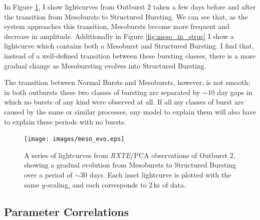 \par In Figure \ref{fig:meso_to_struc}, I show lightcurves from Outburst 2 taken a few days before and after the transition from Mesobursts to Structured Bursting.  We can see that, as the system approaches this transition, Mesobursts become more frequent and decrease in amplitude.  Additionally in Figure \ref{fig:meso_in_struc} I show a lightcurve which contains both a Mesoburst and Structured Bursting.  I find that, instead of a well-defined transition between these bursting classes, there is a more gradual change as Mesobursting evolves into Structured Bursting.
\par The transition between Normal Bursts and Mesobursts, however, is not smooth; in both outbursts these two classes of bursting are separated by $\sim10$ day gaps in which no bursts of any kind were observed at all.  If all my classes of burst are caused by the same or similar processes, any model to explain them will also have to explain these periods with no bursts.

\begin{figure}
  \centering
  \texttt{[image: images/meso\_evo.eps]}
  \caption[A series of lightcurves from \textit{RXTE}/PCA observations of Outburst 2, showing a gradual evolution from Mesobursts to Structured Bursting over a period of $\sim30$ days.]{\small A series of lightcurves from \indexpca\textit{RXTE}/PCA observations of Outburst 2, showing a gradual evolution from Mesobursts to Structured Bursting over a period of $\sim30$ days.  Each inset lightcurve is plotted with the same $y$-scaling, and each corresponds to 2\,ks of data.}
  \label{fig:meso_to_struc}
\end{figure}

\subsection{Parameter Correlations}

